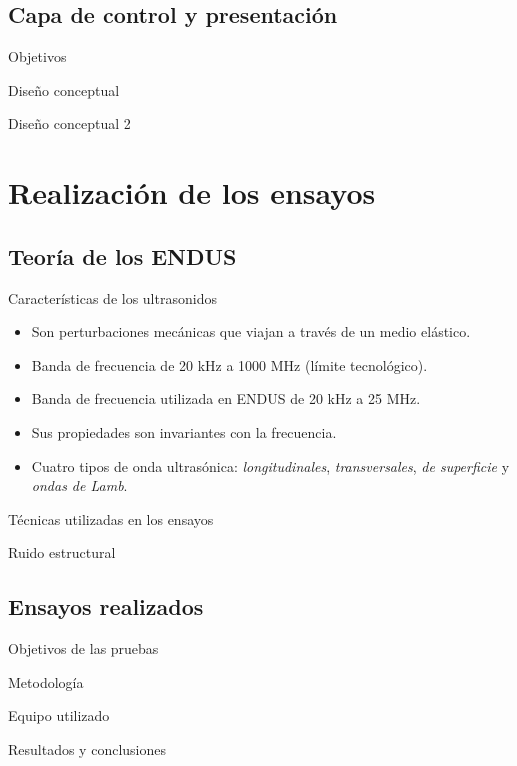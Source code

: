 \documentclass[utf8, compress]			{beamer}
\begin{document}
\subsection{Capa de control y presentación}

\begin{frame}{Objetivos}
\end{frame}

\begin{frame}{Diseño conceptual}
\end{frame}

\begin{frame}{Diseño conceptual 2}
\end{frame}


\section{Realización de los ensayos}

\subsection{Teoría de los ENDUS}

\begin{frame}{Características de los ultrasonidos}
    \begin{itemize}
	\item Son perturbaciones mecánicas que viajan a través de un medio
	    elástico.
	\item Banda de frecuencia de 20 kHz a 1000 MHz (límite
	    tecnológico).
	\item Banda de frecuencia utilizada en ENDUS de 20 kHz a 25 MHz.
	\item Sus propiedades son invariantes con la frecuencia.
	\item Cuatro tipos de onda ultrasónica: \emph{longitudinales},
	    \emph{transversales}, \emph{de superficie} y \emph{ondas de
	    Lamb}.
    \end{itemize}
\end{frame}

\begin{frame}{Técnicas utilizadas en los ensayos}
\end{frame}

\begin{frame}{Ruido estructural}
\end{frame}


\subsection{Ensayos realizados}

\begin{frame}{Objetivos de las pruebas}
\end{frame}

\begin{frame}{Metodología}
\end{frame}

\begin{frame}{Equipo utilizado}
\end{frame}

\begin{frame}{Resultados y conclusiones}
\end{frame}
\end{document}
